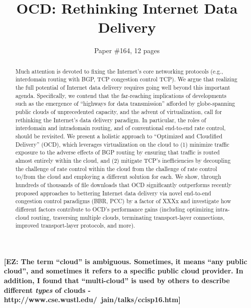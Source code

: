 \documentclass[sigconf,usenames,dvipsnames,geometry]{acmart}
\title{OCD: Rethinking Internet Data Delivery}
\author{Paper \#164, 12 pages}
\newcommand{\mycomm}[3]{{\color{#2} \textbf{[#1: #3]}}}
\newcommand{\mycomm}[3]{}
\newcommand{\EZ}[1]{\mycomm{EZ}{BlueGreen}{#1}}
\begin{document}
\sloppypar
    
\begin{abstract}
Much attention is devoted to fixing the Internet's core networking protocols (e.g., interdomain routing with BGP, TCP congestion control TCP). We argue that realizing the full potential of Internet data delivery requires going well beyond this important agenda. Specifically, we contend that the far-reaching implications of developments such as the emergence of ``highways for data transmission'' afforded by globe-spanning public clouds of unprecedented capacity, and the advent of virtualization, call for rethinking the Internet's data delivery paradigm. In particular, the roles of interdomain and intradomain routing, and of conventional end-to-end rate control, should be revisited. We present a holistic approach to ``Optimized and Cloudified Delivery'' (OCD), which leverages virtualization on the cloud to (1) minimize traffic exposure to the adverse effects of BGP routing by ensuring that traffic is routed almost entirely within the cloud, and (2) mitigate TCP's inefficiencies by decoupling the challenge of rate control within the cloud from the challenge of rate control to/from the cloud and employing a different solution for each. We show, through hundreds of thousands of file downloads that OCD significantly outperforms recently proposed approaches to bettering Internet data delivery via novel end-to-end congestion control paradigms (BBR, PCC) by a factor of XXXx and investigate how different factors contribute to OCD's performance gains (including optimizing intra-cloud routing, traversing multiple clouds, terminating transport-layer connections, improved transport-layer protocols, and more).
\end{abstract}

\ifacmart

\maketitle
\else
\fi




\EZ{The term ``cloud'' is ambiguous. Sometimes, it means ``any public cloud'', and sometimes it refers to a specific public cloud provider. In addition, I found that ``multi-cloud'' is used by others to describe different \emph{types} of clouds - http://www.cse.wustl.edu/~jain/talks/ccisp16.htm}
\end{document}
